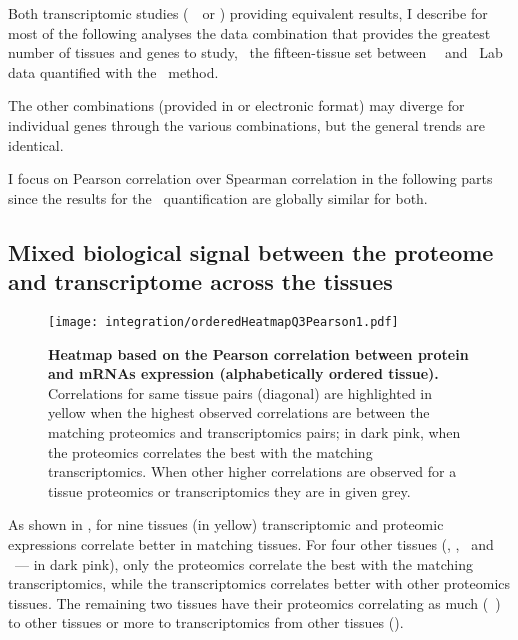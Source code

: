 Both transcriptomic studies (\uhlen\ \etal\ or \gtex)
providing equivalent results,
I describe for most of the following analyses the data combination
that provides the greatest number of tissues and genes to study,
\ie\ the fifteen-tissue set between \uhlen\ \etal\ and \pandey\ Lab data
quantified with the \PPKM\ method.\mybr\

\vspace{-1mm}
The other combinations
(provided in  or electronic format)
may diverge for individual genes through the various combinations,
but the general trends are identical.\mybr\
\vspace{-1mm}

I focus on Pearson correlation over Spearman correlation
in the following parts
since the results for the \PPKM\ quantification are globally similar for both.\mybr\

\subsection{Mixed biological signal between the proteome and transcriptome
across the tissues}
\begin{figure}[!hb]
    \texttt{[image: integration/orderedHeatmapQ3Pearson1.pdf]}\centering
    \vspace{-2mm}
    \caption[Heatmap based on the Pearson correlation between protein and mRNAs
    expression (alphabetically ordered tissue)]{\label{fig:orderedHeatmapPearson}%
    \textbf{Heatmap based on the Pearson correlation between protein and mRNAs
    expression (alphabetically ordered tissue).}
    Correlations for same tissue pairs (diagonal) are highlighted in
    yellow when the highest observed correlations are between the matching proteomics
    and transcriptomics pairs; in dark pink, when the proteomics correlates
    the best with the matching transcriptomics.
    When other higher correlations are observed for a tissue proteomics or transcriptomics
    they are in given grey.}
\end{figure}

As shown in ,
for nine tissues (in yellow) transcriptomic and proteomic expressions correlate
better in matching tissues.
For four other tissues (\hColon, \Lung, \Oesophagus\ and \Urinarybladder\
--- in dark pink),
only the proteomics correlate the best with the matching transcriptomics,
while the transcriptomics correlates better with other proteomics tissues.
The remaining two tissues have their proteomics correlating
as much (\eg\ \Gall) to other tissues or more to transcriptomics
from other tissues (\Rectum).\mybr\

